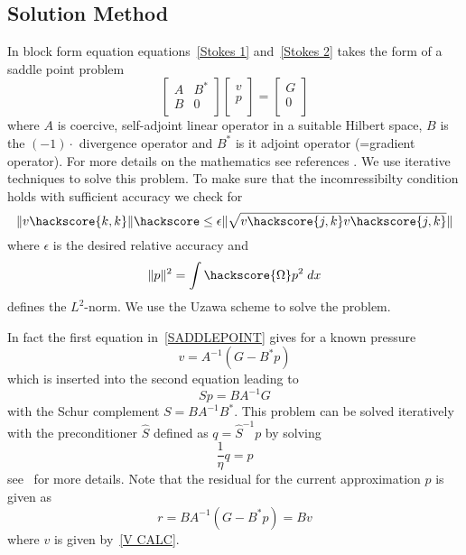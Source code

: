 \subsection{Solution Method \label{STOKES SOLVE}}
In block form equation equations~\ref{Stokes 1} and~\ref{Stokes 2} takes the form of a saddle point problem
\begin{equation}
\left[ \begin{array}{cc}
A     & B^{*} \\
B & 0 \\
\end{array} \right]
\left[ \begin{array}{c}
v \\
p \\
\end{array} \right]
=\left[ \begin{array}{c}
G \\
0 \\
\end{array} \right]
\label{SADDLEPOINT}
\end{equation}
where $A$ is coercive, self-adjoint linear operator in a suitable Hilbert space, $B$ is the $(-1) \cdot$ divergence operator and $B^{*}$ is it adjoint operator (=gradient operator). For more details on the mathematics see references \cite{AAMIRBERKYAN2008,MBENZI2005}. 
We use iterative techniques to solve this problem. To make sure that the incomressibilty condition holds
with sufficient accuracy we check for 
\begin{equation}
\|v\hackscore{k,k}\| \hackscore \le  \epsilon
\|\sqrt{v\hackscore{j,k}v\hackscore{j,k}}\| 
\label{STOKES STOP}
\end{equation}
where $\epsilon$ is the desired relative accuracy and 
\begin{equation}
\|p\|^2= \int\hackscore{\Omega} p^2 \; dx
\label{PRESSURE NORM}
\end{equation}
defines the $L^2$-norm. We use the Uzawa scheme  to solve the problem.
 
In fact the first equation in~\ref{SADDLEPOINT} gives for a known pressure
\begin{equation}
v=A^{-1}(G-B^{*}p)
\label{V CALC}
\end{equation} 
which is inserted into the second equation leading to
\begin{equation}
S p =  B A^{-1} G
\end{equation}
with the Schur complement  $S=BA^{-1}B^{*}$. This problem can be solved iteratively
with the preconditioner $\hat{S}$ defined as $q=\hat{S}^{-1}p$ by solving
\begin{equation} \label{P PREC}
\frac{1}{\eta}q = p 
\end{equation}
see~\cite{ELMAN} for more details. Note that the residual for the current approximation $p$ is given as 
\begin{equation}
r=B A^{-1} (G - B^* p) = Bv 
\end{equation}
where $v$ is given by~\ref{V CALC}. 

